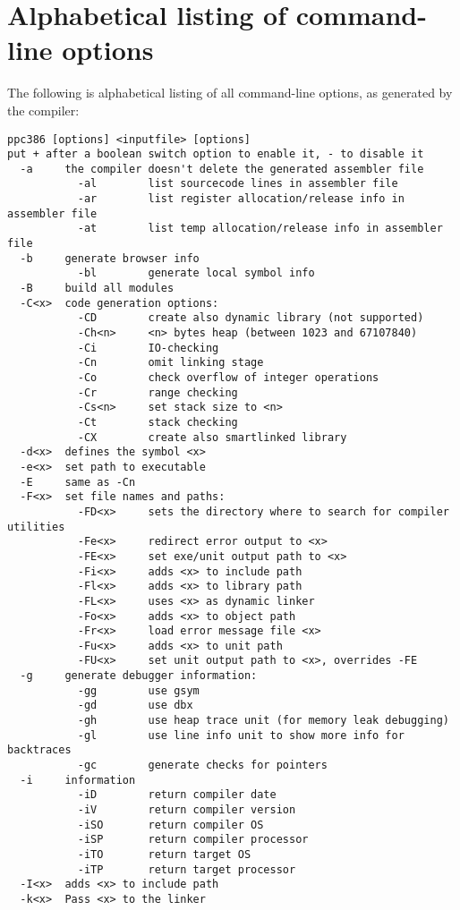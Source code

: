 \documentclass{book}
\begin{document}
\chapter{Alphabetical listing of command-line options}
The following is alphabetical listing of all command-line options, as
generated by the compiler:
\begin{verbatim}
ppc386 [options] <inputfile> [options]
put + after a boolean switch option to enable it, - to disable it
  -a     the compiler doesn't delete the generated assembler file
           -al        list sourcecode lines in assembler file
           -ar        list register allocation/release info in assembler file
           -at        list temp allocation/release info in assembler file
  -b     generate browser info
           -bl        generate local symbol info
  -B     build all modules
  -C<x>  code generation options:
           -CD        create also dynamic library (not supported)
           -Ch<n>     <n> bytes heap (between 1023 and 67107840)
           -Ci        IO-checking
           -Cn        omit linking stage
           -Co        check overflow of integer operations
           -Cr        range checking
           -Cs<n>     set stack size to <n>
           -Ct        stack checking
           -CX        create also smartlinked library
  -d<x>  defines the symbol <x>
  -e<x>  set path to executable
  -E     same as -Cn
  -F<x>  set file names and paths:
           -FD<x>     sets the directory where to search for compiler utilities
           -Fe<x>     redirect error output to <x>
           -FE<x>     set exe/unit output path to <x>
           -Fi<x>     adds <x> to include path
           -Fl<x>     adds <x> to library path
           -FL<x>     uses <x> as dynamic linker
           -Fo<x>     adds <x> to object path
           -Fr<x>     load error message file <x>
           -Fu<x>     adds <x> to unit path
           -FU<x>     set unit output path to <x>, overrides -FE
  -g     generate debugger information:
           -gg        use gsym
           -gd        use dbx
           -gh        use heap trace unit (for memory leak debugging)
           -gl        use line info unit to show more info for backtraces
           -gc        generate checks for pointers
  -i     information
           -iD        return compiler date
           -iV        return compiler version
           -iSO       return compiler OS
           -iSP       return compiler processor
           -iTO       return target OS
           -iTP       return target processor
  -I<x>  adds <x> to include path
  -k<x>  Pass <x> to the linker

\end{verbatim}
\end{document}
